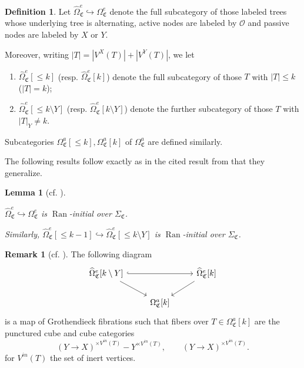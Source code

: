 \documentclass[a4paper,10pt
,draft
]{article}%
\numberwithin{equation}{section}
\numberwithin{figure}{section}
\newtheorem{lemma}[equation]{Lemma}%
\theoremstyle{definition} %
\newtheorem{definition}[equation]{Definition}%
\newtheorem{remark}[equation]{Remark}%
\newcommand{\into}{\hookrightarrow}%
\DeclareMathOperator{\Ran}{Ran}%
\renewcommand{\O}{\ensuremath{\mathcal O}}
\newcommand{\1}{\ensuremath{\mathbbm 1}}%
\newcommand{\SC}{\Sigma_{\mathfrak C}}
\newcommand{\OC}{\Omega_{\mathfrak C}}
\begin{document}
\begin{definition}
      Let
$\widehat{\Omega}_{\mathfrak C}^{e} \hookrightarrow \Omega_{\mathfrak C}^{e}$
denote the full subcategory of those labeled trees whose underlying tree is alternating, active nodes are labeled by $\O$ 
and passive nodes are labeled by $X$ or $Y$.

Moreover, writing $|T| = |V^X(T)|+ |V^Y(T)|$, we let
\begin{enumerate}[label=(\roman*)]
\item $\widehat{\Omega}_{\mathfrak C}^{e}[\leq k]$ (resp. $\widehat{\Omega}_{\mathfrak C}^{e}[k]$)
denote the full subcategory of those $T$ with $|T| \leq k$ ($|T|=k$);
\item $\widehat{\Omega}_{\mathfrak C}^{e}[\leq k \setminus Y]$ (resp. $\widehat{\Omega}_{\mathfrak C}^{e}[k \setminus Y]$)
denote the further subcategory of those $T$ with $|T|_Y \neq k$.
\end{enumerate}
Subcategories $\OC^a[\leq k], \OC^a[k]$ of $\OC^a$ are defined similarly.
\end{definition}



The following results follow exactly as in the cited result from 
\cite{BP_geo} that they generalize.

\begin{lemma}[{cf. \cite[Cor. 5.53, Lemma 5.58]{BP_geo}}]
\label{LANINT LEM}

	$\widehat\Omega_{\mathfrak C}^e \into 
	\Omega_{\mathfrak C}^e$
	is $\Ran$-initial over $\SC$.
     
	Similarly, $\widehat\Omega_{\mathfrak C}^e[\leq k-1] \into 
\widehat\Omega_{\mathfrak C}^e[\leq k \setminus Y]$
	is $\Ran$-initial over $\SC$.
\end{lemma}

\begin{remark}[{cf. \cite[Remark 5.57]{BP_geo}}]
      \label{OEFIB REM}
      The following diagram
      \begin{equation}
            \begin{tikzcd}
                  \widehat\Omega_{\mathfrak C}^e[k \setminus Y] \arrow[rr, hookrightarrow] \arrow[dr]
                  &&
                  \widehat\Omega_{\mathfrak C}^e[k] \arrow[dl]
                  \\
                  &
                  \Omega_{\mathfrak C}^a[k]
            \end{tikzcd}
      \end{equation}
	is a map of Grothendieck fibrations
	such that fibers over $T \in \Omega_{\mathfrak C}^a[k]$ are the punctured cube and cube categories
      \begin{equation}
            (Y \to X)^{\times V^{in}(T)} - Y^{\times V^{in}(T)},
            \qquad
            (Y \to X)^{\times V^{in}(T)}.
      \end{equation}
	for $V^{in}(T)$ the set of inert vertices.
\end{remark}
\end{document}
